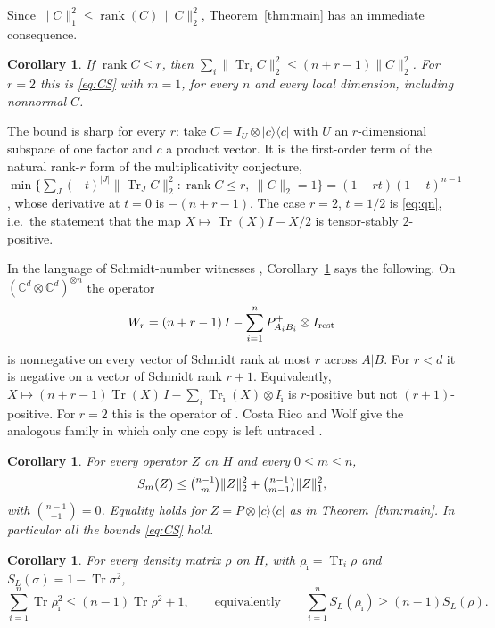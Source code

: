 \documentclass[11pt]{article}
\newtheorem{corollary}[theorem]{Corollary}
\theoremstyle{remark}
\newcommand{\Tr}{\operatorname{Tr}}
\newcommand{\norm}[1]{\lVert #1\rVert}
\begin{document}
Since $\norm{C}_1^2\le\operatorname{rank}(C)\,\norm{C}_2^2$, Theorem~\ref{thm:main} has an immediate consequence.

\begin{corollary}\label{cor:rank}
If $\operatorname{rank}C\le r$, then $\sum_i\norm{\Tr_iC}_2^2\le(n+r-1)\norm{C}_2^2$. For $r=2$ this is \eqref{eq:CS}
with $m=1$, for every $n$ and every local dimension, including nonnormal $C$.
\end{corollary}

The bound is sharp for every $r$: take $C=I_U\otimes|c\rangle\langle c|$ with $U$ an $r$-dimensional subspace of one
factor and $c$ a product vector. It is the first-order term of the natural rank-$r$ form of the multiplicativity
conjecture,
$\min\{\sum_J(-t)^{|J|}\norm{\Tr_JC}_2^2:\operatorname{rank}C\le r,\ \norm{C}_2=1\}=(1-rt)(1-t)^{n-1}$, whose
derivative at $t=0$ is $-(n+r-1)$. The case $r=2$, $t=1/2$ is \eqref{eq:qn}, i.e.\ the statement that the map
$X\mapsto\Tr(X)I-X/2$ is tensor-stably $2$-positive.

In the language of Schmidt-number witnesses \cite{CRW}, Corollary~\ref{cor:rank} says the following. On
$(\mathbb C^d\otimes\mathbb C^d)^{\otimes n}$ the operator
\[
W_r=(n+r-1)\,I-\sum_{i=1}^nP^+_{A_iB_i}\otimes I_{\rm rest}
\]
is nonnegative on every vector of Schmidt rank at most $r$ across $A|B$. For $r<d$ it is negative on a vector of
Schmidt rank $r+1$. Equivalently, $X\mapsto(n+r-1)\Tr(X)\,I-\sum_i\Tr_{\hat\imath}(X)\otimes I_{\hat\imath}$ is
$r$-positive but not $(r+1)$-positive. For $r=2$ this is the operator of \cite{CS}. Costa Rico and Wolf give the
analogous family in which only one copy is left untraced \cite{CRW}.

\begin{corollary}\label{cor:allm}
For every operator $Z$ on $H$ and every $0\le m\le n$,
\[
S_m(Z)\le\tbinom{n-1}{m}\norm{Z}_2^2+\tbinom{n-1}{m-1}\norm{Z}_1^2,
\]
with $\binom{n-1}{-1}=0$. Equality holds for $Z=P\otimes|c\rangle\langle c|$ as in Theorem~\ref{thm:main}. In particular
all the bounds \eqref{eq:CS} hold.
\end{corollary}

\begin{corollary}\label{cor:han}
For every density matrix $\rho$ on $H$, with $\rho_{\hat\imath}=\Tr_i\rho$ and $S_L(\sigma)=1-\Tr\sigma^2$,
\[
\sum_{i=1}^n\Tr\rho_{\hat\imath}^2\le(n-1)\Tr\rho^2+1,
\qquad\text{equivalently}\qquad
\sum_{i=1}^nS_L(\rho_{\hat\imath})\ge(n-1)S_L(\rho).
\]
\end{corollary}
\end{document}
